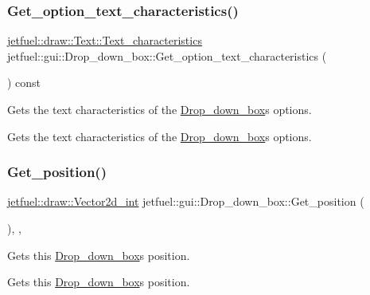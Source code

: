 \subsubsection{\texorpdfstring{Get\+\_\+option\+\_\+text\+\_\+characteristics()}{Get\_option\_text\_characteristics()}}
{\footnotesize\ttfamily \hyperlink{structjetfuel_1_1draw_1_1Text_1_1Text__characteristics}{jetfuel\+::draw\+::\+Text\+::\+Text\+\_\+characteristics} jetfuel\+::gui\+::\+Drop\+\_\+down\+\_\+box\+::\+Get\+\_\+option\+\_\+text\+\_\+characteristics (\begin{DoxyParamCaption}{ }\end{DoxyParamCaption}) const\hspace{0.3cm}{\ttfamily [inline]}}



Gets the text characteristics of the \hyperlink{classjetfuel_1_1gui_1_1Drop__down__box}{Drop\+\_\+down\+\_\+box}\textquotesingle{}s options. 

Gets the text characteristics of the \hyperlink{classjetfuel_1_1gui_1_1Drop__down__box}{Drop\+\_\+down\+\_\+box}\textquotesingle{}s options. \mbox{\label{classjetfuel_1_1gui_1_1Drop__down__box_af92cccd010b21e1ce64af9a3c58ba086}} 
\subsubsection{\texorpdfstring{Get\+\_\+position()}{Get\_position()}}
{\footnotesize\ttfamily \hyperlink{classjetfuel_1_1draw_1_1Vector2d}{jetfuel\+::draw\+::\+Vector2d\+\_\+int} jetfuel\+::gui\+::\+Drop\+\_\+down\+\_\+box\+::\+Get\+\_\+position (\begin{DoxyParamCaption}{ }\end{DoxyParamCaption})\hspace{0.3cm}{\ttfamily [inline]}, {\ttfamily [override]}, {\ttfamily [virtual]}}



Gets this \hyperlink{classjetfuel_1_1gui_1_1Drop__down__box}{Drop\+\_\+down\+\_\+box}\textquotesingle{}s position. 

Gets this \hyperlink{classjetfuel_1_1gui_1_1Drop__down__box}{Drop\+\_\+down\+\_\+box}\textquotesingle{}s position. 

